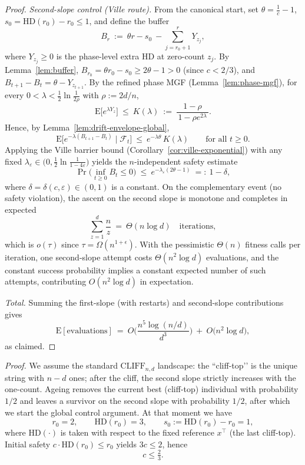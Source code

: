 \documentclass[lettersize,journal]{IEEEtran}
\newcommand{\EE}{\text{E}}
\newcommand{\HD}{\text{HD}}
\begin{document}
\begin{proof}
	\emph{Second-slope control (Ville route).}
	From the canonical start, set $\theta=\tfrac{1}{c}-1$, $s_0=\HD(r_0)-r_0\le 1$, and define the buffer
	\[
	B_r\ :=\ \theta r - s_0\ -\sum_{j=r_0+1}^{r} Y_{z_j},
	\]
	where $Y_{z_j}\ge 0$ is the phase-level extra HD at zero-count $z_j$.
	By Lemma~\ref{lem:buffer}, $B_{r_0}=\theta r_0-s_0\ge 2\theta-1>0$ (since $c<2/3$), and $B_{t+1}-B_t=\theta-Y_{z_{t+1}}$.
	By the refined phase MGF (Lemma~\ref{lem:phase-mgf}), for every $0<\lambda<\tfrac12\ln\!\tfrac{1}{2\rho}$ with $\rho:=2d/n$,
	\[
	\EE\!\big[e^{\lambda Y_z}\big]\ \le\ K(\lambda)\ :=\ \frac{1-\rho}{\,1-\rho e^{2\lambda}\,}.
	\]
	Hence, by Lemma~\ref{lem:drift-envelope-global},
	\[
	\EE\!\big[e^{-\lambda(B_{t+1}-B_t)}\mid\mathcal F_t\big]\ \le\ e^{-\lambda\theta}\,K(\lambda)\qquad\text{for all }t\ge 0.
	\]
	Applying the Ville barrier bound (Corollary~\ref{cor:ville-exponential}) with any fixed
	$\lambda_\varepsilon\in\big(0,\tfrac12\ln\!\tfrac{1}{1-4\varepsilon}\big)$ yields the $n$-independent safety estimate
	\[
	\Pr\!\Big(\inf_{t\ge 0} B_t\le 0\Big)\ \le\ e^{-\lambda_\varepsilon(2\theta-1)}\ =:\ 1-\delta,
	\]
	where $\delta=\delta(c,\varepsilon)\in(0,1)$ is a constant.
	On the complementary event (no safety violation), the ascent on the second slope is monotone and completes in expected
	\[
	\sum_{z=1}^{d}\frac{n}{z}\ =\ \Theta(n\log d)\quad\text{iterations},
	\]
	which is $o(\tau)$ since $\tau=\Omega(n^{1+\epsilon})$.
	With the pessimistic $\Theta(n)$ fitness calls per iteration, one second-slope attempt costs $\Theta(n^{2}\log d)$ evaluations, and the constant success probability implies a constant expected number of such attempts, contributing $O(n^{2}\log d)$ in expectation.
	
	\emph{Total.}
	Summing the first-slope (with restarts) and second-slope contributions gives
	\[
	\EE[\text{evaluations}]
	\ =\ O\!\Big(\frac{n^{5}\log(n/d)}{d^{3}}\Big)\ +\ O\!\big(n^{2}\log d\big),
	\]
	as claimed.
\end{proof}


\medskip

\emph{Proof.}
We assume the standard \(\mathrm{CLIFF}_{n,d}\) landscape: the “cliff-top’’ is the unique string with \(n-d\) ones; after the cliff, the second slope strictly increases with the one-count.
Ageing removes the current best (cliff-top) individual with probability \(1/2\) and leaves a survivor on the second slope with probability \(1/2\), after which we start the global control argument.
At that moment we have
\[
r_0=2,\qquad \mathrm{HD}(r_0)=3,\qquad s_0:=\mathrm{HD}(r_0)-r_0=1,
\]
where \(\mathrm{HD}(\cdot)\) is taken with respect to the fixed reference \(x^\top\) (the last cliff-top). 
Initial safety \(c\cdot \mathrm{HD}(r_0)\le r_0\) yields \(3c\le 2\), hence
\[
c\le \tfrac23.\tag{$\star$}
\]
\end{document}
